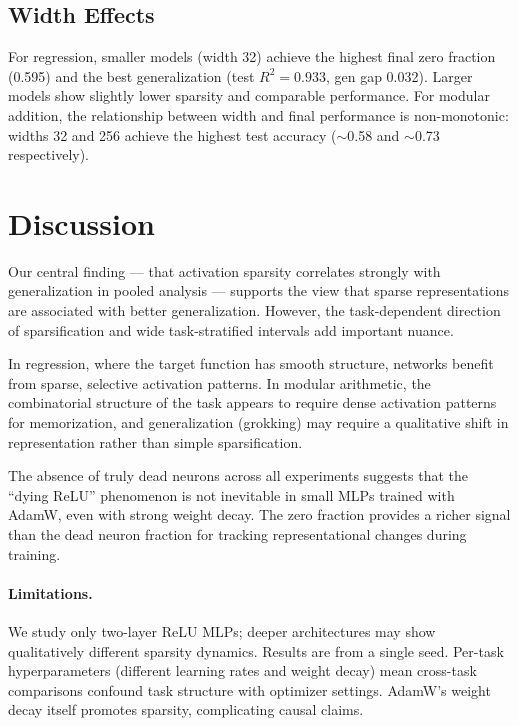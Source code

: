 \documentclass[11pt,a4paper]{article}
\begin{document}
\subsection{Width Effects}

For regression, smaller models (width 32) achieve the highest final
zero fraction (0.595) and the best generalization (test $R^2 = 0.933$,
gen gap 0.032). Larger models show slightly lower sparsity and comparable
performance. For modular addition, the relationship between width and
final performance is non-monotonic: widths 32 and 256 achieve the highest
test accuracy ($\sim$0.58 and $\sim$0.73 respectively).

\section{Discussion}

Our central finding --- that activation sparsity correlates strongly with
generalization in pooled analysis --- supports the view that sparse
representations are associated with better generalization. However, the
task-dependent direction of sparsification and wide task-stratified
intervals add important nuance.

In regression, where the target function has smooth structure, networks
benefit from sparse, selective activation patterns. In modular arithmetic,
the combinatorial structure of the task appears to require dense
activation patterns for memorization, and generalization (grokking) may
require a qualitative shift in representation rather than simple
sparsification.

The absence of truly dead neurons across all experiments suggests that
the ``dying ReLU'' phenomenon is not inevitable in small MLPs trained
with AdamW, even with strong weight decay. The zero fraction provides a
richer signal than the dead neuron fraction for tracking representational
changes during training.

\paragraph{Limitations.}
We study only two-layer ReLU MLPs; deeper architectures may show
qualitatively different sparsity dynamics. Results are from a single seed.
Per-task hyperparameters (different learning rates and weight decay) mean
cross-task comparisons confound task structure with optimizer settings.
AdamW's weight decay itself promotes sparsity, complicating causal claims.
\end{document}
